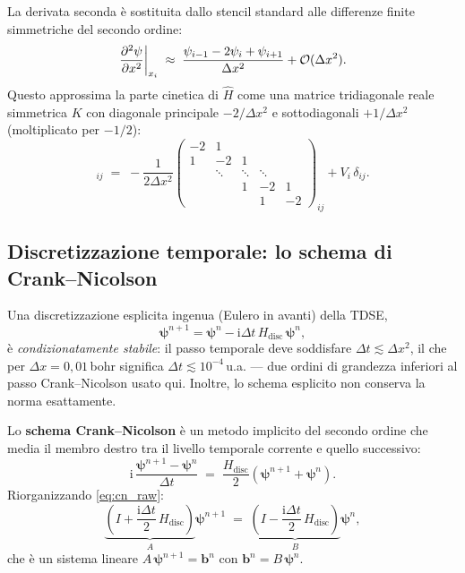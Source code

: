 \documentclass[12pt, a4paper]{article}
\newcommand{\dt}{\Delta t}
\newcommand{\dx}{\Delta x}
\newcommand{\ii}{\mathrm{i}}          %
\newcommand{\CN}{Crank--Nicolson}
\newcommand{\Htop}{\hat{H}}
\begin{document}
La derivata seconda è sostituita dallo stencil standard alle differenze
finite simmetriche del secondo ordine:
\begin{equation}
  \pdv[2]{\psi}{x}\bigg|_{x_i}
  \;\approx\;
  \frac{\psi_{i-1} - 2\psi_i + \psi_{i+1}}{\dx^2}
  + \mathcal{O}(\dx^2).
  \label{eq:fd_stencil}
\end{equation}
Questo approssima la parte cinetica di $\Htop$ come una matrice tridiagonale
reale simmetrica $K$ con diagonale principale $-2/\dx^2$ e sottodiagonali
$+1/\dx^2$ (moltiplicato per $-1/2$):
\begin{equation}
  [H_\text{disc}]_{ij}
  \;=\;
  -\frac{1}{2\dx^2}\begin{pmatrix}
    -2 & 1 \\
    1 & -2 & 1 \\
      & \ddots & \ddots & \ddots \\
      &        & 1 & -2 & 1 \\
      &        &   & 1  & -2
  \end{pmatrix}_{ij}
  + V_i\,\delta_{ij}.
  \label{eq:Hdisc}
\end{equation}

\subsection{Discretizzazione temporale: lo schema di Crank--Nicolson}

Una discretizzazione esplicita ingenua (Eulero in avanti) della TDSE,
\begin{equation}
  \boldsymbol{\psi}^{n+1} = \boldsymbol{\psi}^n
  - \ii\dt\, H_\text{disc}\,\boldsymbol{\psi}^n,
\end{equation}
è \emph{condizionatamente stabile}: il passo temporale deve soddisfare
$\dt \lesssim \dx^2$, il che per $\dx = 0{,}01$\,bohr significa
$\dt \lesssim 10^{-4}$\,u.a. — due ordini di grandezza inferiori al
passo \CN{} usato qui. Inoltre, lo schema esplicito non conserva
la norma esattamente.

Lo \textbf{schema \CN{}} \cite{CrankNicolson1947} è un metodo implicito
del secondo ordine che media il membro destro tra il livello temporale
corrente e quello successivo:
\begin{equation}
  \ii\,\frac{\boldsymbol{\psi}^{n+1} - \boldsymbol{\psi}^n}{\dt}
  \;=\;
  \frac{H_\text{disc}}{2}\!\left(\boldsymbol{\psi}^{n+1}
  + \boldsymbol{\psi}^n\right).
  \label{eq:cn_raw}
\end{equation}
Riorganizzando \eqref{eq:cn_raw}:
\begin{equation}
  \underbrace{\left(I + \frac{\ii\dt}{2}\,H_\text{disc}\right)}_{A}
  \boldsymbol{\psi}^{n+1}
  \;=\;
  \underbrace{\left(I - \frac{\ii\dt}{2}\,H_\text{disc}\right)}_{B}
  \boldsymbol{\psi}^n,
  \label{eq:cn_system}
\end{equation}
che è un sistema lineare $A\,\boldsymbol{\psi}^{n+1} = \mathbf{b}^n$
con $\mathbf{b}^n = B\,\boldsymbol{\psi}^n$.
\end{document}
